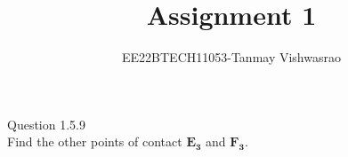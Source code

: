 \documentclass[journal,12pt,twocolumn]{IEEEtran}
\theoremstyle{remark}
\begin{document}
\let\vec\mathbf





\vspace{3cm}

\title{
Assignment 1
}
\author{ EE22BTECH11053-Tanmay Vishwasrao%
	
}	

\maketitle

\newpage


\bigskip

\renewcommand{\thefigure}{\theenumi}
\renewcommand{\thetable}{\theenumi}
Question 1.5.9\\
Find the other points of contact $\vec{E_3}$ and $\vec{F_3}$.
\end{document}
